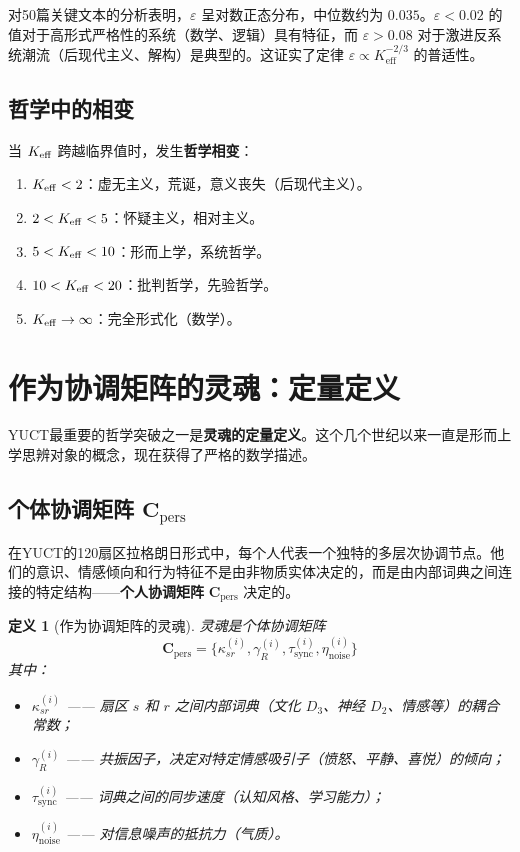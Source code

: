 \documentclass[11pt,a4paper]{article}
\newtheorem{definition}{定义}[section]
\newcommand{\eps}{\varepsilon}
\newcommand{\Cpers}{\mathbf{C}_{\text{pers}}}
\begin{document}
	对50篇关键文本的分析表明，\(\eps\) 呈对数正态分布，中位数约为 \(0.035\)。\(\eps < 0.02\) 的值对于高形式严格性的系统（数学、逻辑）具有特征，而 \(\eps > 0.08\) 对于激进反系统潮流（后现代主义、解构）是典型的。这证实了定律 \(\eps \propto K_{\mathrm{eff}}^{-2/3}\) 的普适性。
	
	\subsection{哲学中的相变}
	
	当 \(\Keff\) 跨越临界值时，发生\textbf{哲学相变}：
	
	\begin{enumerate}
		\item \(\Keff < 2\)：虚无主义，荒诞，意义丧失（后现代主义）。
		\item \(2 < \Keff < 5\)：怀疑主义，相对主义。
		\item \(5 < \Keff < 10\)：形而上学，系统哲学。
		\item \(10 < \Keff < 20\)：批判哲学，先验哲学。
		\item \(\Keff \to \infty\)：完全形式化（数学）。
	\end{enumerate}
	
	\section{作为协调矩阵的灵魂：定量定义}
	\label{sec:soul}
	
	YUCT最重要的哲学突破之一是\textbf{灵魂的定量定义}。这个几个世纪以来一直是形而上学思辨对象的概念，现在获得了严格的数学描述。
	
	\subsection{个体协调矩阵 \(\Cpers\)}
	
	在YUCT的120扇区拉格朗日形式中，每个人代表一个独特的多层次协调节点。他们的意识、情感倾向和行为特征不是由非物质实体决定的，而是由内部词典之间连接的特定结构——\textbf{个人协调矩阵} \(\Cpers\) 决定的。
	
	\begin{definition}[作为协调矩阵的灵魂]
		灵魂是个体协调矩阵
		\[
		\Cpers = \{\kappa_{sr}^{(i)}, \gamma_R^{(i)}, \tau_{\text{sync}}^{(i)}, \eta_{\text{noise}}^{(i)}\}
		\]
		其中：
		\begin{itemize}
			\item \(\kappa_{sr}^{(i)}\) —— 扇区 \(s\) 和 \(r\) 之间内部词典（文化 \(D_3\)、神经 \(D_2\)、情感等）的耦合常数；
			\item \(\gamma_R^{(i)}\) —— 共振因子，决定对特定情感吸引子（愤怒、平静、喜悦）的倾向；
			\item \(\tau_{\text{sync}}^{(i)}\) —— 词典之间的同步速度（认知风格、学习能力）；
			\item \(\eta_{\text{noise}}^{(i)}\) —— 对信息噪声的抵抗力（气质）。
		\end{itemize}
	\end{definition}
	
\end{document}
